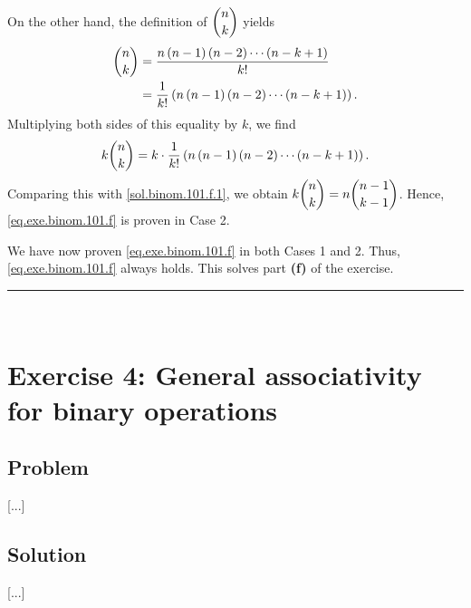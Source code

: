 \documentclass[paper=a4, fontsize=12pt]{scrartcl} %
\newcommand{\tup}[1]{\left( #1 \right)}
\newcommand{\horrule}[1]{\rule{\linewidth}{#1}} %
\theoremstyle{plainsl}
\theoremstyle{definition}
\theoremstyle{remark}
\begin{document}
On the other hand, the definition of $\dbinom{n}{k}$ yields
\begin{align}
\dbinom{n}{k}
&= \dfrac{n \tup{n-1} \tup{n-2} \cdots \tup{n-k+1}}{k!} \nonumber \\
&= \dfrac{1}{k!} \tup{n \tup{n-1} \tup{n-2} \cdots \tup{n-k+1}} .
\end{align}
Multiplying both sides of this equality by $k$, we find
\[
k \dbinom{n}{k}
= k \cdot \dfrac{1}{k!} \tup{n \tup{n-1} \tup{n-2} \cdots \tup{n-k+1}} .
\]
Comparing this with \eqref{sol.binom.101.f.1},
we obtain $k \dbinom{n}{k} = n \dbinom{n-1}{k-1}$.
Hence, \eqref{eq.exe.binom.101.f} is proven in Case 2.

We have now proven \eqref{eq.exe.binom.101.f} in both
Cases 1 and 2. Thus, \eqref{eq.exe.binom.101.f} always holds.
This solves part \textbf{(f)} of the exercise.

\horrule{0.3pt} \\[0.4cm]

\section{Exercise 4: General associativity for binary operations}

\subsection{Problem}

[...]

\subsection{Solution}

[...]
\end{document}

